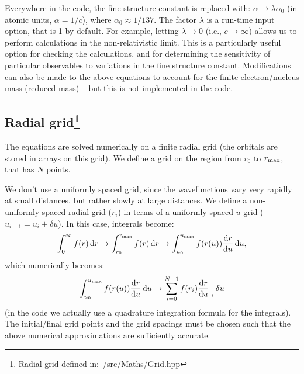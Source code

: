 \documentclass[10pt,twocolumn,a4paper]{article}%
\newcommand{\be}{\begin{equation}}
\newcommand{\ee}{\end{equation}}
\def\d{\ensuremath{{\rm d}}}
\begin{document}
Everywhere in the code, the fine structure constant is replaced with: $\alpha\to\lambda \alpha_0$ (in atomic units, $\alpha=1/c$), where $\alpha_0\approx1/137$.
The factor $\lambda$ is a run-time input option, that is 1 by default. %
For example, letting $\lambda\to0$ (i.e., $c\to\infty$) allows us to perform calculations in the non-relativistic limit.
This is a particularly useful option for checking the calculations, and for determining the sensitivity of particular observables to variations in the fine structure constant.
Modifications can also be made to the above equations to account for the finite electron/nucleus mass (reduced mass) -- but this is not implemented in the code.

%





\subsection[Radial grid]{Radial grid\label{sec:grid}\footnote{Radial grid defined in:~/src/Maths/Grid.hpp}}

The equations are solved numerically on a finite radial grid (the orbitals are stored in arrays on this grid).
We define a grid on the region from $r_0$ to $r_{\rm max}$, that has $N$ points.

We don't use a uniformly spaced grid, since the wavefunctions vary very rapidly at small distances, but rather slowly at large distances.
We define a non-uniformly-spaced radial grid ($r_i$) in terms of a uniformly spaced $u$ grid ($u_{i+1}=u_i+\delta u$).
In this case, integrals become:
\be
\int_{0}^{\infty} f(r)\,\d r \to 
\int_{r_0}^{\rm r_{max}} f(r)\,\d r \to 
\int_{u_0}^{u_{\rm max}} f(r(u))\frac{\d r}{\d u}\,\d u,
\ee
which numerically becomes:
\be
\int_{u_0}^{u_{\rm max}} f(r(u))\frac{\d r}{\d u}\,\d u \to
\sum_{i=0}^{N-1} f(r_i)\frac{\d r}{\d u}\Big|_i\,\delta u
\ee
(in the code we actually use a quadrature integration formula for the integrals).
The initial/final grid points and the grid spacings must be chosen such that the above numerical approximations are sufficiently accurate.
\end{document}
